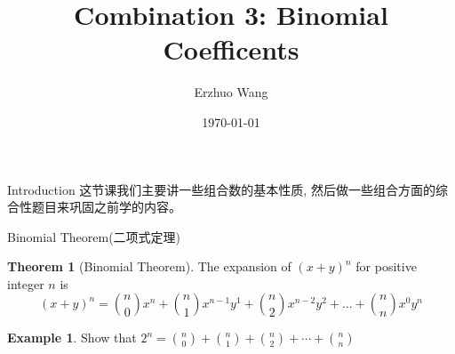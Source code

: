\documentclass{beamer}
\title{Combination 3: Binomial Coefficents}
\institute{Youth STEM Academy}
\author{Erzhuo Wang}
\date{\today}
\theoremstyle{definition}
\newtheorem{theo}[defn]{Theorem}
\newtheorem{exam}[defn]{Example}
\newenvironment{prooff}{{\noindent\it\textcolor{cyan!40!black}{Proof}:}\,}{\par}
\begin{document}
\begin{frame}
    \titlepage
\end{frame}
\begin{frame}{Introduction}
    这节课我们主要讲一些组合数的基本性质, 然后做一些组合方面的综合性题目来巩固之前学的内容。


\end{frame}
\begin{frame}{Binomial Theorem(二项式定理)}
    \begin{theo}[Binomial Theorem]
        The expansion of $(x+y)^n$ for positive integer $n$ is
        \begin{equation*}
            (x+y)^n=\binom{n}{0}x^n+\binom{n}{1}x^{n-1}y^1+\binom{n}{2}x^{n-2}y^2+\dots+\binom{n}{n}x^0y^n
        \end{equation*}
    \end{theo}
    \begin{exam}
        Show that $2^n= \binom{n}{0}+\binom{n}{1}+\binom{n}{2}+\cdots+\binom{n}{n}$
    \end{exam}
\end{frame}


\end{document}
